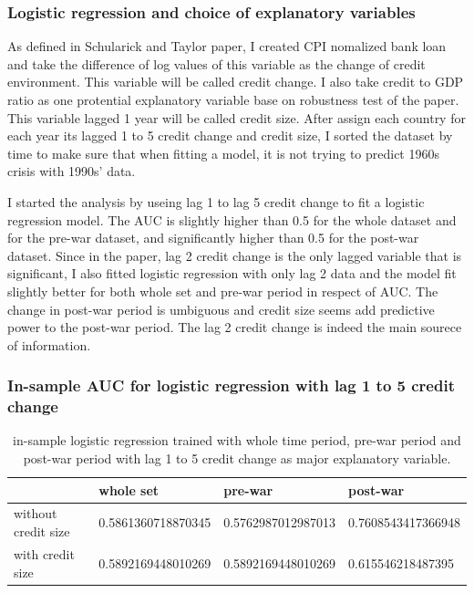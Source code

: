 \documentclass{article}
\begin{document}
\subsubsection*{Logistic regression and choice of explanatory variables}

As defined in Schularick and Taylor paper, I created CPI nomalized bank
loan and take the difference of log values of this variable as the change
of credit environment. This variable will be called credit change. I also
take credit to GDP ratio as one protential
explanatory variable base on robustness test of the paper. This variable
lagged 1 year will be called credit size. After
assign each country for each year its lagged 1 to 5 credit change and credit size, I
sorted the dataset by time to make sure that when fitting a model, it is
not trying to predict 1960s crisis with 1990s' data.

I started the analysis by useing lag 1 to lag 5 credit change to fit a
logistic regression model. The AUC is slightly higher than 0.5 for the whole
dataset and for the pre-war dataset, and significantly higher than 0.5
for the post-war dataset. Since in the paper, lag 2 credit change is the only
lagged variable that
is significant, I also fitted logistic regression with only lag 2 data
and the model fit slightly better for both whole set and pre-war period
in respect of AUC. The change in post-war period is umbiguous and 
credit size seems add predictive power to the post-war period. The lag 2 credit
change is indeed the
main sourece of information.

\subsubsection*{\centering{}In-sample AUC for logistic regression with lag 1 to 5 credit change}

\begin{table}[H]
    \begin{center}\begin{tabular}{|l|l|l|l|}
    \hline
                        & whole set          & pre-war            & post-war           \\ \hline
    without credit size & 0.5861360718870345 & 0.5762987012987013 & 0.7608543417366948 \\ \hline
    with credit size    & 0.5892169448010269 & 0.5892169448010269 & 0.615546218487395 \\ \hline
    \end{tabular}\end{center}
    \caption{in-sample logistic regression trained with whole time period,
    pre-war period and post-war period with lag 1 to 5 credit change as major
    explanatory variable.}
\end{table}
\end{document}
